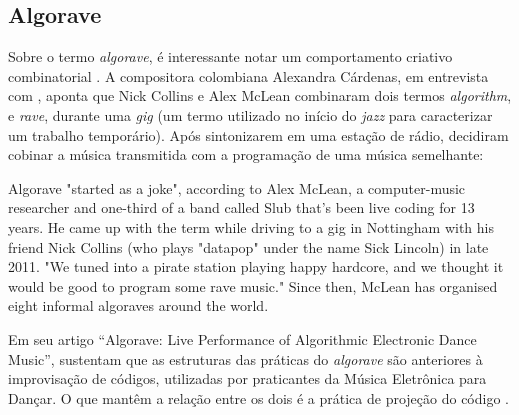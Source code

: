 \subsection{Algorave}\label{sec:algorave}

Sobre o termo \emph{algorave}, é interessante notar um comportamento criativo combinatorial . A compositora colombiana Alexandra Cárdenas, em entrevista com , aponta que Nick Collins e Alex McLean combinaram dois termos \emph{algorithm}, e \emph{rave}, durante uma \emph{gig} (um termo utilizado no início do \emph{jazz} para caracterizar um trabalho temporário). Após sintonizarem em uma estação de rádio, decidiram cobinar a música transmitida com a programação de uma música semelhante:

\begin{citacao}
{
Algorave "started as a joke", according to Alex McLean, a computer-music researcher and one-third of a band called Slub that's been live coding for 13 years. He came up with the term while driving to a gig in Nottingham with his friend Nick Collins (who plays "datapop" under the name Sick Lincoln) in late 2011. "We tuned into a pirate station playing happy hardcore, and we thought it would be good to program some rave music." Since then, McLean has organised eight informal algoraves around the world. 
}
\end{citacao}

Em seu artigo ``Algorave: Live Performance of Algorithmic Electronic Dance Music'',  sustentam que as estruturas das práticas do \emph{algorave} são anteriores à improvisação de códigos, utilizadas por praticantes da Música Eletrônica para Dançar. O que mantêm a relação entre os dois é a prática de projeção do código .

